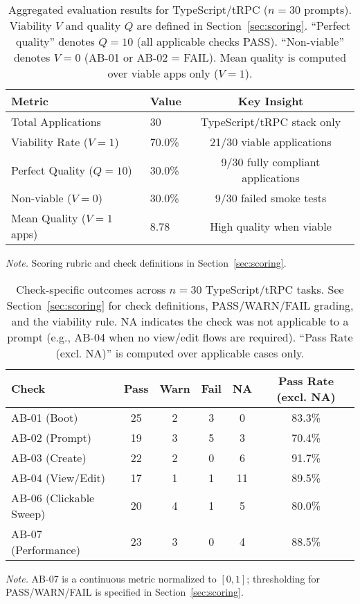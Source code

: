 \documentclass{article}
\begin{document}
\begin{table}[t]
\caption{Aggregated evaluation results for TypeScript/tRPC ($n=30$ prompts). Viability $V$ and quality $Q$ are defined in Section~\ref{sec:scoring}. ``Perfect quality'' denotes $Q=10$ (all applicable checks PASS). ``Non-viable'' denotes $V=0$ (AB-01 or AB-02 = FAIL). Mean quality is computed over viable apps only ($V=1$).}
\label{tab:aggregated-results}
\centering
\begin{threeparttable}
\begin{tabular}{llc}
\toprule
Metric & Value & Key Insight \\
\midrule
Total Applications & 30 & TypeScript/tRPC stack only \\
Viability Rate ($V=1$) & 70.0\% & 21/30 viable applications \\
Perfect Quality ($Q=10$) & 30.0\% & 9/30 fully compliant applications \\
Non-viable ($V=0$) & 30.0\% & 9/30 failed smoke tests \\
Mean Quality ($V=1$ apps) & 8.78 & High quality when viable \\
\bottomrule
\end{tabular}
\begin{tablenotes}
\item \textit{Note.} Scoring rubric and check definitions in Section~\ref{sec:scoring}.
\end{tablenotes}
\end{threeparttable}
\end{table}

\begin{table}[t]
\caption{Check-specific outcomes across $n=30$ TypeScript/tRPC tasks. See Section~\ref{sec:scoring} for check definitions, PASS/WARN/FAIL grading, and the viability rule. NA indicates the check was not applicable to a prompt (e.g., AB-04 when no view/edit flows are required). ``Pass Rate (excl. NA)'' is computed over applicable cases only.}
\label{tab:check-pass-rates}
\centering
\begin{threeparttable}
\begin{tabular}{lccccc}
\toprule
Check & Pass & Warn & Fail & NA & Pass Rate (excl. NA) \\
\midrule
AB-01 (Boot) & 25 & 2 & 3 & 0 & 83.3\% \\
AB-02 (Prompt) & 19 & 3 & 5 & 3 & 70.4\% \\
AB-03 (Create) & 22 & 2 & 0 & 6 & 91.7\% \\
AB-04 (View/Edit) & 17 & 1 & 1 & 11 & 89.5\% \\
AB-06 (Clickable Sweep) & 20 & 4 & 1 & 5 & 80.0\% \\
AB-07 (Performance) & 23 & 3 & 0 & 4 & 88.5\% \\
\bottomrule
\end{tabular}
\begin{tablenotes}
\item \textit{Note.} AB-07 is a continuous metric normalized to $[0,1]$; thresholding for PASS/WARN/FAIL is specified in Section~\ref{sec:scoring}.
\end{tablenotes}
\end{threeparttable}
\end{table}
\end{document}
